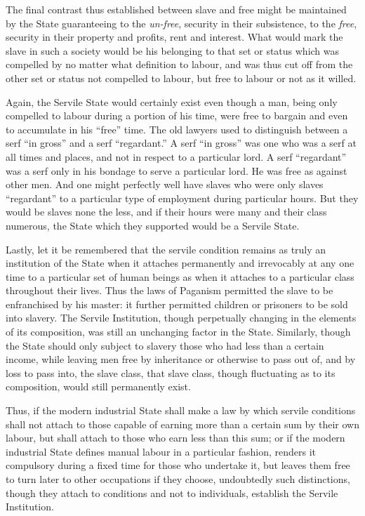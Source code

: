 \documentclass{book}
\begin{document}
The final contrast thus established between slave and free might be maintained by the State guaranteeing to the \emph{un-free}, security in their subsistence, to the \emph{free}, security in their property and profits, rent and interest. What would mark the slave in such a society would be his belonging to that set or status which was compelled by no matter what definition to labour, and was thus cut off from the other set or status not compelled to labour, but free to labour or not as it willed.

Again, the Servile State would certainly exist even though a man, being only compelled to labour during a portion of his time, were free to bargain and even to accumulate in his “free” time. The old lawyers used to distinguish between a serf “in gross” and a serf “regardant.” A serf “in gross” was one who was a serf at all times and places, and not in respect to a particular lord. A serf “regardant” was a serf only in his bondage to serve a particular lord. He was free as against other men. And one might perfectly well have slaves who were only slaves “regardant” to a particular type of employment during particular hours. But they would be slaves none the less, and if their hours were many and their class numerous, the State which they supported would be a Servile State.

Lastly, let it be remembered that the servile condition remains as truly an institution of the State when it attaches permanently and irrevocably at any one time to a particular set of human beings as when it attaches to a particular class throughout their lives. Thus the laws of Paganism permitted the slave to be enfranchised by his master: it further permitted children or prisoners to be sold into slavery. The Servile Institution, though perpetually changing in the elements of its composition, was still an unchanging factor in the State. Similarly, though the State should only subject to slavery those who had less than a certain income, while leaving men free by inheritance or otherwise to pass out of, and by loss to pass into, the slave class, that slave class, though fluctuating as to its composition, would still permanently exist.

Thus, if the modern industrial State shall make a law by which servile conditions shall not attach to those capable of earning more than a certain sum by their own labour, but shall attach to those who earn less than this sum; or if the modern industrial State defines manual labour in a particular fashion, renders it compulsory during a fixed time for those who undertake it, but leaves them free to turn later to other occupations if they choose, undoubtedly such distinctions, though they attach to conditions and not to individuals, establish the Servile Institution.
\end{document}
